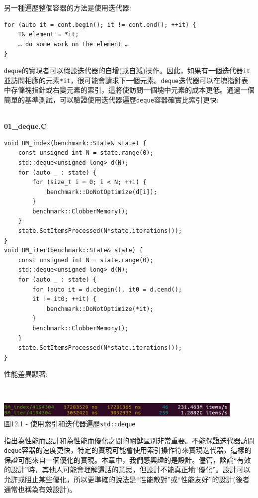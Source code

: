 另一種遍歷整個容器的方法是使用迭代器:

\begin{lstlisting}[style=styleCXX]
for (auto it = cont.begin(); it != cont.end(); ++it) {
	T& element = *it;
	… do some work on the element …
}
\end{lstlisting}

\texttt{deque}的實現者可以假設迭代器的自增(或自減)操作。因此，如果有一個迭代器\texttt{it}並訪問相應的元素\texttt{*it}，很可能會請求下一個元素。\texttt{deque}迭代器可以在塊指針表中存儲塊指針或右變元素的索引，這將使訪問一個塊中元素的成本更低。通過一個簡單的基準測試，可以驗證使用迭代器遍歷\texttt{deque}容器確實比索引更快:

\hspace*{\fill} \\ %
\noindent
\textbf{01\_deque.C}
\begin{lstlisting}[style=styleCXX]
void BM_index(benchmark::State& state) {
	const unsigned int N = state.range(0);
	std::deque<unsigned long> d(N);
	for (auto _ : state) {
		for (size_t i = 0; i < N; ++i) {
			benchmark::DoNotOptimize(d[i]);
		}
		benchmark::ClobberMemory();
	}
	state.SetItemsProcessed(N*state.iterations());
}
void BM_iter(benchmark::State& state) {
	const unsigned int N = state.range(0);
	std::deque<unsigned long> d(N);
	for (auto _ : state) {
		for (auto it = d.cbegin(), it0 = d.cend(); 
		it != it0; ++it) {
			benchmark::DoNotOptimize(*it);
		}
		benchmark::ClobberMemory();
	}
	state.SetItemsProcessed(N*state.iterations());
}
\end{lstlisting}

性能差異顯著:

\hspace*{\fill} \\ %
\begin{center}
\includegraphics[width=0.9\textwidth]{content/3/chapter12/images/1.jpg}\\
圖12.1 - 使用索引和迭代器遍歷\texttt{std::deque}
\end{center}

指出為性能而設計和為性能而優化之間的關鍵區別非常重要。不能保證迭代器訪問\texttt{deque}容器的速度更快，特定的實現可能會使用索引操作符來實現迭代器，這樣的保證可能來自一個優化的實現。本章中，我們感興趣的是設計。儘管，談論“有效的設計”時，其他人可能會理解這話的意思，但設計不能真正地“優化”。設計可以允許或阻止某些優化，所以更準確的說法是“性能敵對”或“性能友好”的設計(後者通常也稱為有效設計)。

